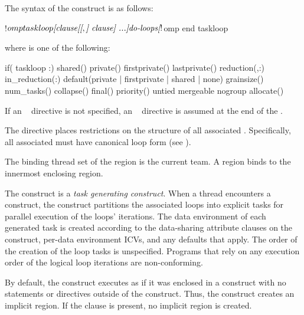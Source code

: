 \begin{fortranspecific}
The syntax of the  construct is as follows:
\begin{ompfPragma}
!$omp taskloop \plc{[clause[[},\plc{] clause] ...]}
    \plc{do-loops}
\plc{[}!$omp end taskloop\plc{]}
\end{ompfPragma}
where  is one of the following:
\begin{indentedcodelist}
if(\plc{[} taskloop :\plc{] scalar-logical-expr})
shared()
private()
firstprivate()
lastprivate()
reduction(\plc{[ reduction-modifier},\plc{]reduction-identifier }:)
in_reduction(:)
default(private \textnormal{|} firstprivate \textnormal{|} shared \textnormal{|} none)
grainsize()
num_tasks()
collapse()
final()
priority()
untied
mergeable
nogroup
allocate(\plc{[allocator: ]})
\end{indentedcodelist}

If an ~ directive is not specified, an
~ directive is assumed at the end of the
.

The  directive places restrictions on the structure of all
associated . Specifically, all associated  must
have canonical loop form (see ).
\end{fortranspecific}

\binding
The binding thread set of the  region is the current team. A  region binds to the innermost enclosing  region.

\descr
The  construct is a \emph{task generating construct}. When a thread encounters a  construct, the construct partitions the associated loops into explicit tasks for parallel execution of the loops' iterations. The data environment of each generated task is created according to the data-sharing attribute clauses on the  construct, per-data environment ICVs, and any defaults that apply. The order of the creation of the loop tasks is unspecified.
Programs that rely on any execution order of the logical loop iterations are non-conforming.

By default, the  construct executes as if it was enclosed in a  construct with no statements or directives outside of the  construct. Thus, the  construct creates an implicit  region. If the  clause is present, no implicit  region is created.

